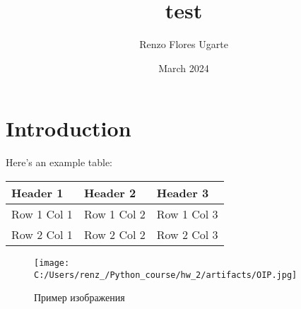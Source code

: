 \documentclass{article}
\title{test}
\author{Renzo Flores Ugarte}
\date{March 2024}
\begin{document}
\maketitle

\section{Introduction}

Here's an example table:

\begin{center}
\begin{tabular}{|l|l|l|}
\hline
Header 1 & Header 2 & Header 3 \\
\hline
Row 1 Col 1 & Row 1 Col 2 & Row 1 Col 3 \\
\hline
Row 2 Col 1 & Row 2 Col 2 & Row 2 Col 3 \\
\hline
\end{tabular}

\end{center}

\begin{figure}[h]
\centering
\texttt{[image: C:/Users/renz\_/Python\_course/hw\_2/artifacts/OIP.jpg]}
\caption{Пример изображения}
\label{fig:exampleImage}
\end{figure}
\end{document}
